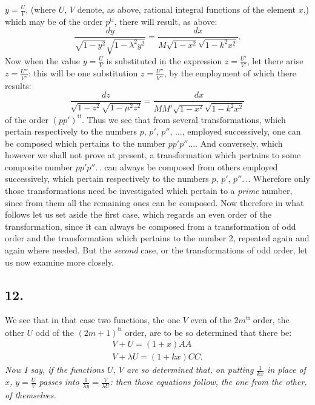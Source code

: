 \documentclass{article}
\begin{document}
$y=\frac{U}{V}$, (where $U$, $V$ denote, as above, rational integral functions of the element $x$,) which may be of the order $p^{\mathrm{ti}}$, there will result, as above:
\[
\frac{dy}{\sqrt{1-y^{2}}\sqrt{1-\lambda^{2}y^{2}}}=\frac{dx}{M\sqrt{1-x^{2}}\sqrt{1-k^{2}x^{2}}}.
\]
Now when the value $y=\frac{U}{V}$ is substituted in the expression $z=\frac{U'}{V'}$, let there arise $z=\frac{U''}{V''}$: this will be one substitution $z=\frac{U''}{V''}$, by the employment of which there results:
\[
\frac{dz}{\sqrt{1-z^{2}}\sqrt{1-\mu^{2}z^{2}}}=\frac{dx}{MM'\sqrt{1-x^{2}}\sqrt{1-k^{2}x^{2}}}
\]
of the order $(pp')^{\mathrm{ti}}$. Thus we see that from several transformations, which pertain respectively to the numbers $p$, $p'$, $p''$, $\ldots$, employed successively, one can be composed which pertains to the number $pp'p''\ldots$. And conversely, which however we shall not prove at present, a transformation which pertains to some composite number $pp'p''.\,.$ can always be composed from others employed successively, which pertain respectively to the numbers $p$, $p'$, $p''.\,.$. Wherefore only those transformations need be investigated which pertain to a \emph{prime} number, since from them all the remaining ones can be composed. Now therefore in what follows let us set aside the first case, which regards an even order of the transformation, since it can always be composed from a transformation of odd order and the transformation which pertains to the number 2, repeated again and again where needed. But the \emph{second} case, or the transformations of odd order, let us now examine more closely.

\subsection*{12.}

We see that in that case two functions, the one $V$ even of the $2m^{\mathrm{ti}}$ order, the other $U$ odd of the $(2m+1)^{\mathrm{ti}}$ order, are to be so determined that there be:
\[
\begin{gathered}
V+U=(1+x)AA\\
V+\lambda U=(1+kx)CC.
\end{gathered}
\]
\emph{Now I say, if the functions $U$, $V$ are so determined that, on putting $\frac{1}{kx}$ in place of $x$, $y=\frac{U}{V}$ passes into $\frac{1}{\lambda y}=\frac{V}{\lambda U}$: then those equations follow, the one from the other, of themselves.}

\end{document}
